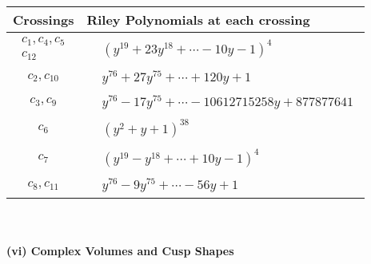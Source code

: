 \documentclass[1p]{elsarticle_modified}
\theoremstyle{definition}
\begin{document}
\begin{tabular}{m{50pt}|m{274pt}}
Crossings & \hspace{64pt}Riley Polynomials at each crossing \\
\hline $$\begin{aligned}c_{1},c_{4},c_{5}\\c_{12}\end{aligned}$$&$\begin{aligned}
&(y^{19}+23 y^{18}+\cdots-10 y-1)^{4}
\end{aligned}$\\
\hline $$\begin{aligned}c_{2},c_{10}\end{aligned}$$&$\begin{aligned}
&y^{76}+27 y^{75}+\cdots+120 y+1
\end{aligned}$\\
\hline $$\begin{aligned}c_{3},c_{9}\end{aligned}$$&$\begin{aligned}
&y^{76}-17 y^{75}+\cdots-10612715258 y+877877641
\end{aligned}$\\
\hline $$\begin{aligned}c_{6}\end{aligned}$$&$\begin{aligned}
&(y^2+y+1)^{38}
\end{aligned}$\\
\hline $$\begin{aligned}c_{7}\end{aligned}$$&$\begin{aligned}
&(y^{19}- y^{18}+\cdots+10 y-1)^{4}
\end{aligned}$\\
\hline $$\begin{aligned}c_{8},c_{11}\end{aligned}$$&$\begin{aligned}
&y^{76}-9 y^{75}+\cdots-56 y+1
\end{aligned}$\\
\hline
\end{tabular}\\~\\
\newpage\flushleft \textbf{(vi) Complex Volumes and Cusp Shapes}
\end{document}
